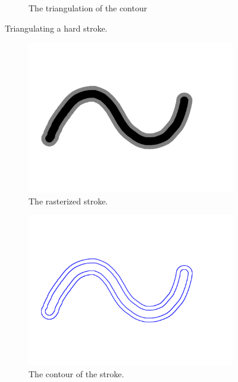 \documentclass[review]{acmsiggraph}
\begin{document}
\begin{figure}
\begin{subfigure}[b]{0.3\textwidth}
  \caption{The triangulation of the contour}
  \label{fig:sub2}
\end{subfigure}
\caption{Triangulating a hard stroke.}
\label{fig:test}
\end{figure}

\begin{figure}
\centering
\begin{subfigure}[b]{0.3\textwidth}
  \centering
  \includegraphics[width=.9\textwidth]{images/stroke_triangulation/softrendered}
  \caption{The rasterized stroke.}
  \label{fig:sub1}
\end{subfigure}%
\begin{subfigure}[b]{0.3\textwidth}
  \centering
  \includegraphics[width=.9\textwidth]{images/stroke_triangulation/softpruned}
  \caption{The contour of the stroke.}
  \label{fig:sub2}
\end{subfigure}
\begin{subfigure}[b]{0.3\textwidth}

\end{subfigure}
\end{figure}
\end{document}
